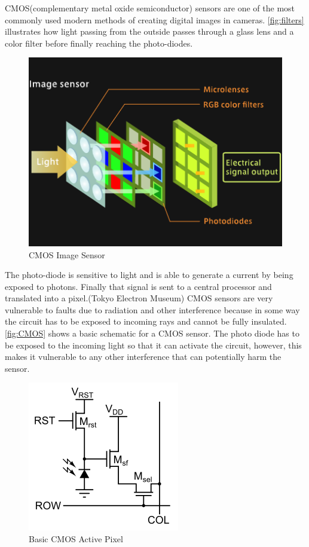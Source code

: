 
CMOS(complementary metal oxide semiconductor) sensors are one of the most commonly used modern methods of creating digital images in cameras.  \autoref{fig:filters} illustrates how light passing from the outside passes through a glass lens and a color filter before finally reaching the photo-diodes.
\begin{figure}[H]
    \includegraphics[scale= .5]{assets/ImageSensor.png}
    \caption{CMOS Image Sensor}
    \label{fig:filters}
\end{figure}
The photo-diode is sensitive to light and is able to generate a current by being exposed to photons.  Finally that signal is sent to a central processor and translated into a pixel.(Tokyo Electron Museum)  CMOS sensors are very vulnerable to faults due to radiation and other interference because in some way the circuit has to be exposed to incoming rays and cannot be fully insulated. \autoref{fig:CMOS} shows a basic schematic for a CMOS sensor.  The photo diode has to be exposed to the incoming light so that it can activate the circuit, however, this makes it vulnerable to any other interference that can potentially harm the sensor.  
\begin{figure}[H]
    \includegraphics[scale= .75]{assets/Cmos schemateic.png}
    \caption{Basic CMOS Active Pixel}
    \label{fig:CMOS}
\end{figure}
